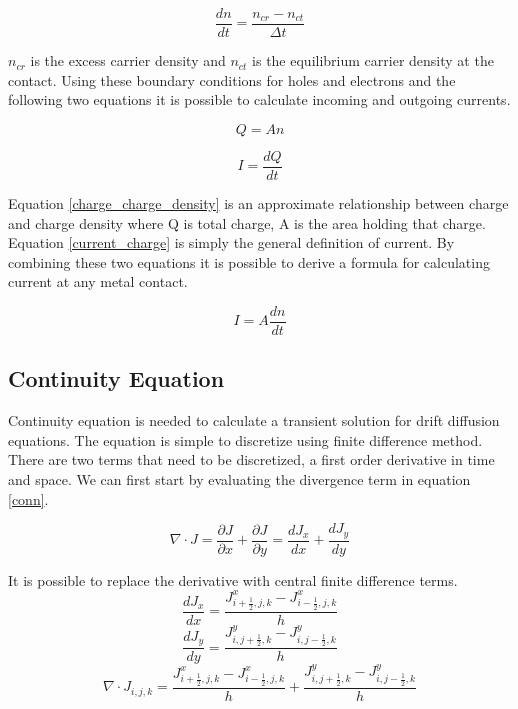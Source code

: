 \begin{equation}
\frac{dn}{dt}=\frac{n_{cr}-n_{ct}}{\Delta t}
\end{equation}

$n_{cr}$ is the excess carrier density and $n_{ct}$ is the equilibrium carrier density at the contact. Using these boundary conditions for holes and electrons and the following two equations it is possible to calculate incoming and outgoing currents. 

\begin{equation}
Q=An
\label{charge_charge_density}
\end{equation} 

\begin{equation}
I=\frac{dQ}{dt}
\label{current_charge}
\end{equation} 
 

Equation \ref{charge_charge_density} is an approximate relationship between charge and charge density where Q is total charge, A is the area holding that charge. Equation \ref{current_charge} is simply the general definition of current. By combining these two equations it is possible to derive a formula for calculating current at any metal contact.

\begin{equation}
I=A \frac{dn}{dt}
\label{current_charge_density}
\end{equation}


\clearpage
\subsection{Continuity Equation}
Continuity equation is needed to calculate a transient solution for drift diffusion equations. The equation is simple to discretize using finite difference method. There are two terms that need to be discretized, a first order derivative in time and space. We can first start by evaluating the divergence term in equation \eqref{conn}.

\begin{equation}
\nabla \cdot J=\frac{\partial J}{\partial x}+\frac{\partial J}{\partial y}=\frac{d J_x}{d x}+\frac{d J_y}{d y}
\end{equation}

It is possible to replace the derivative with central finite difference terms.
\begin{equation}
\frac{d J_x}{d x}=\frac{J^x_{i+\frac{1}{2},j,k}-J^x_{i-\frac{1}{2},j,k}}{h}
\end{equation}
\begin{equation}
\frac{d J_y}{d y}=\frac{J^y_{i,j+\frac{1}{2},k}-J^y_{i,j-\frac{1}{2},k}}{h}
\end{equation}
\begin{equation}
\nabla \cdot J_{i,j,k}=\frac{J^x_{i+\frac{1}{2},j,k}-J^x_{i-\frac{1}{2},j,k}}{h}+\frac{J^y_{i,j+\frac{1}{2},k}-J^y_{i,j-\frac{1}{2},k}}{h}
\end{equation}

